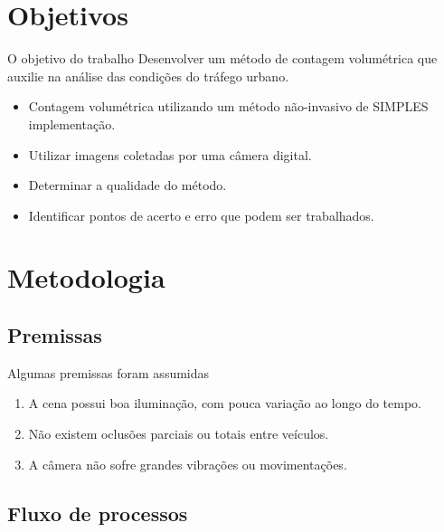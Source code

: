 
\section{Objetivos} %
\label{sec:objetivos}

\begin{frame}{O objetivo do trabalho}
  Desenvolver um método de contagem volumétrica que auxilie na análise das condições do tráfego urbano.
  \pause
  \begin{itemize}
    \item Contagem volumétrica utilizando um método não-invasivo de \alert{SIMPLES} implementação.
    \item Utilizar imagens coletadas por uma câmera digital.
    \item Determinar a qualidade do método.
    \item Identificar pontos de acerto e erro que podem ser trabalhados.
  \end{itemize}
\end{frame}


\section{Metodologia} %
\label{sec:metodologia}

\subsection{Premissas} %
\label{sub:premissas}

\begin{frame}{Algumas premissas foram assumidas}
  \begin{enumerate}
    \item A cena possui boa iluminação, com pouca variação ao longo do tempo.
    \item Não existem oclusões parciais ou totais entre veículos.
    \item A câmera não sofre grandes vibrações ou movimentações.
  \end{enumerate} 
\end{frame}


\subsection{Fluxo de processos} %
\label{sub:fluxo_de_processos}

